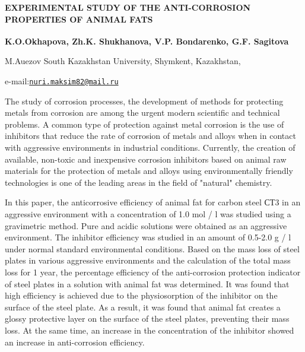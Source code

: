\begin{articleheader}

{\bfseries EXPERIMENTAL STUDY OF THE ANTI-CORROSION PROPERTIES OF ANIMAL
FATS}

{\bfseries K.O.Okhapova\textsuperscript{\envelope }, Zh.K. Shukhanova, V.P.
Bondarenko, G.F. Sagitova}
\end{articleheader}
\begin{affiliation}

M.Auezov South Kazakhstan University, Shymkent, Kazakhstan,

e-mail:\href{mailto:nuri.maksim82@mail.ru}{\nolinkurl{nuri.maksim82@mail.ru}}
\end{affiliation}

The study of corrosion processes, the development of methods for
protecting metals from corrosion are among the urgent modern scientific
and technical problems. A common type of protection against metal
corrosion is the use of inhibitors that reduce the rate of corrosion of
metals and alloys when in contact with aggressive environments in
industrial conditions. Currently, the creation of available, non-toxic
and inexpensive corrosion inhibitors based on animal raw materials for
the protection of metals and alloys using environmentally friendly
technologies is one of the leading areas in the field of "natural"
chemistry.

In this paper, the anticorrosive efficiency of animal fat for carbon
steel СТ3 in an aggressive environment with a concentration of 1.0 mol /
l was studied using a gravimetric method. Pure and acidic solutions were
obtained as an aggressive environment. The inhibitor efficiency was
studied in an amount of 0.5-2.0 g / l under normal standard
environmental conditions. Based on the mass loss of steel plates in
various aggressive environments and the calculation of the total mass
loss for 1 year, the percentage efficiency of the anti-corrosion
protection indicator of steel plates in a solution with animal fat was
determined. It was found that high efficiency is achieved due to the
physiosorption of the inhibitor on the surface of the steel plate. As a
result, it was found that animal fat creates a glossy protective layer
on the surface of the steel plates, preventing their mass loss. At the
same time, an increase in the concentration of the inhibitor showed an
increase in anti-corrosion efficiency.

